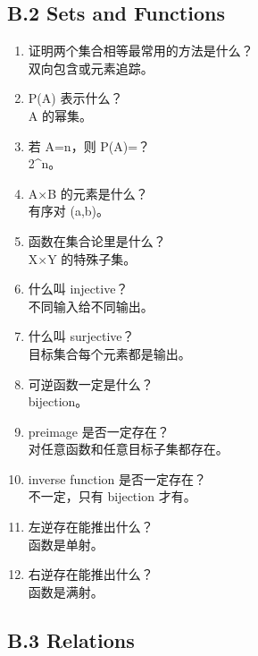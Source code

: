 \documentclass[
  11pt,
]{article}
\begin{document}
\subsection{B.2 Sets and Functions}\label{b.2-sets-and-functions}

\begin{enumerate}
\def\labelenumi{\arabic{enumi}.}
\setcounter{enumi}{15}
\item
  证明两个集合相等最常用的方法是什么？\\
  双向包含或元素追踪。
\item
  P(A) 表示什么？\\
  A 的幂集。
\item
  若 \textbar A\textbar=n，则 \textbar P(A)\textbar=？\\
  2\^{}n。
\item
  A×B 的元素是什么？\\
  有序对 (a,b)。
\item
  函数在集合论里是什么？\\
  X×Y 的特殊子集。
\item
  什么叫 injective？\\
  不同输入给不同输出。
\item
  什么叫 surjective？\\
  目标集合每个元素都是输出。
\item
  可逆函数一定是什么？\\
  bijection。
\item
  preimage 是否一定存在？\\
  对任意函数和任意目标子集都存在。
\item
  inverse function 是否一定存在？\\
  不一定，只有 bijection 才有。
\item
  左逆存在能推出什么？\\
  函数是单射。
\item
  右逆存在能推出什么？\\
  函数是满射。
\end{enumerate}

\subsection{B.3 Relations}\label{b.3-relations}
\end{document}
